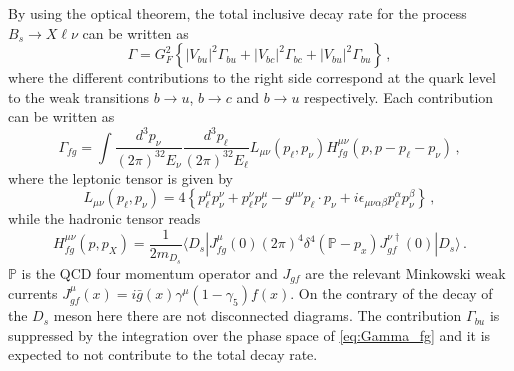 By using the optical theorem, the total inclusive decay rate for the
process $B_s \to X\ell\nu$ can be written as
\begin{equation}
  \Gamma = G^2_F\left\{ |V_{bu} |^2 \Gamma_{bu} + |V_{bc} |^2 \Gamma_{bc} + |V_{bu} |^2 \Gamma_{bu}
  \right\}\,,
\end{equation}
where the different contributions to the right side correspond at the quark level
to the weak transitions $b \to u$, $b \to c$ and $b \to u$ respectively. Each contribution can be written as
\begin{equation}\label{eq:Gamma_fg}
  \Gamma_{fg}=\int \frac{d^3p_\nu}{(2\pi)^32E_\nu}\frac{d^3p_\ell}{(2\pi)^32E_\ell}
  L_{\mu\nu}(p_\ell, p_\nu) H^{\mu\nu}_{fg}(p,p-p_\ell-p_\nu)\,,
\end{equation}
where the leptonic tensor is given by
\begin{equation}
  L_{\mu\nu}(p_\ell, p_\nu) =4\left\{p_\ell^\mu p_\nu^\nu +p_\ell^\nu
  p_\nu^\mu - g^{\mu\nu} p_\ell\cdot p_\nu+
  i\epsilon_{\mu\nu\alpha\beta} p_\ell^\alpha p_\nu^\beta\right\}\,,
\end{equation}
while the hadronic tensor reads
\begin{equation}
  H^{\mu\nu}_{fg}(p,p_X)=\frac{1}{2m_{D_s}}\langle D_s| J^\mu_{fg}(0)(2\pi)^4
  \delta^4(\mathbb{P}-p_x) J^{\nu\dagger}_{gf} (0)| D_s\rangle\,.
\end{equation}
$\mathbb{P}$ is the QCD four momentum operator and $J_{gf}$ are the
relevant Minkowski weak currents $J_{gf}^\mu(x)=i\bar
  g(x)\gamma^\mu(1-\gamma_5)f(x)$.
On the contrary of the decay of the $D_s$ meson here there are not disconnected
diagrams. The contribution $\Gamma_{bu}$ is suppressed by the integration over
the phase space of \eqref{eq:Gamma_fg} and it is expected to not contribute to the total
decay rate.

